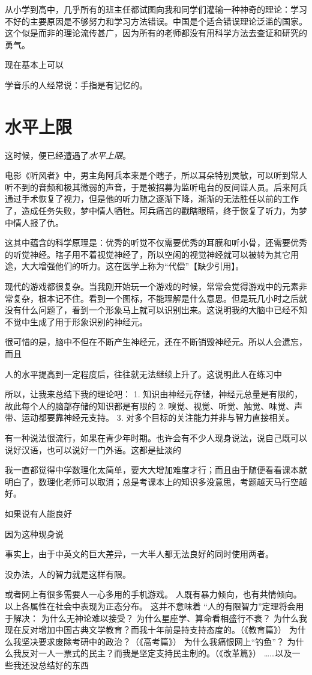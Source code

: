 从小学到高中，几乎所有的班主任都试图向我和同学们灌输一种神奇的理论：学习不好的主要原因是不够努力和学习方法错误。中国是个适合错误理论泛滥的国家。这个似是而非的理论流传甚广，因为所有的老师都没有用科学方法去查证和研究的勇气。


现在基本上可以

学音乐的人经常说：手指是有记忆的。

\section{水平上限}
这时候，便已经遭遇了\textit{水平上限}。


电影《听风者》中，男主角阿兵本来是个瞎子，所以耳朵特别灵敏，可以听到常人听不到的音频和极其微弱的声音，于是被招募为监听电台的反间谍人员。后来阿兵通过手术恢复了视力，但是他的听力随之逐渐下降，渐渐的无法胜任以前的工作了，造成任务失败，梦中情人牺牲。阿兵痛苦的戳瞎眼睛，终于恢复了听力，为梦中情人报了仇。

这其中蕴含的科学原理是：优秀的听觉不仅需要优秀的耳膜和听小骨，还需要优秀的听觉神经。瞎子用不着视觉神经了，所以空闲的视觉神经就可以被转为其它用途，大大增强他们的听力。这在医学上称为“代偿”【缺少引用】。

现代的游戏都很复杂。当我刚开始玩一个游戏的时候，常常会觉得游戏中的元素非常复杂，根本记不住。看到一个图标，不能理解是什么意思。但是玩几小时之后就没有什么问题了，看到一个形象马上就可以识别出来。这说明我的大脑中已经不知不觉中生成了用于形象识别的神经元。

很可惜的是，脑中不但在不断产生神经元，还在不断销毁神经元。所以人会遗忘，而且

人的水平提高到一定程度后，往往就无法继续上升了。这说明此人在练习中

所以，让我来总结下我的理论吧：
1. 知识由神经元存储，神经元总量是有限的，故此每个人的脑部存储的知识都是有限的
2. 嗅觉、视觉、听觉、触觉、味觉、声带、运动都要靠神经元支持。
3.
对多个目标的关注能力并非与智力直接相关。

有一种说法很流行，如果在青少年时期。也许会有不少人现身说法，说自己既可以说好汉语，也可以说好一门外语。这都是扯淡的

我一直都觉得中学数理化太简单，要大大增加难度才行；而且由于随便看看课本就明白了，数理化老师可以取消；总是考课本上的知识多没意思，考题越天马行空越好。

如果说有人能良好

因为这种现身说

事实上，由于中英文的巨大差异，一大半人都无法良好的同时使用两者。

没办法，人的智力就是这样有限。


或者网上有很多需要人一心多用的手机游戏。
人既有暴力倾向，也有共情倾向。
以上各属性在社会中表现为正态分布。
这并不意味着
“人的有限智力”定理将会用于解决：
为什么无神论难以接受？
为什么星座学、算命看相盛行不衰？
为什么我现在反对增加中国古典文学教育？而我十年前是持支持态度的。（《教育篇》）
为什么我坚决要求废除考研中的政治？（《高考篇》）
为什么我痛恨网上“钓鱼”？
为什么我反对一人一票式的民主？而我是坚定支持民主制的。（《改革篇》）
……以及一些我还没总结好的东西
